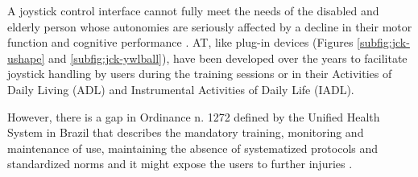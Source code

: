 A joystick control interface cannot fully meet the needs of the disabled and elderly person whose autonomies are seriously affected by a decline in their motor function and cognitive performance \cite{rechy2012}. AT, like plug-in devices (Figures \ref{subfig:jck-ushape} and \ref{subfig:jck-ywlball}), have been developed over the years to facilitate joystick handling by users during the training sessions or in their Activities of Daily Living (ADL) and Instrumental Activities of Daily Life  (IADL)\cite{american2014, american2008}. 

However, there is a gap in Ordinance n. 1272 defined by the Unified Health System in Brazil that describes the mandatory training, monitoring and maintenance of use, maintaining the absence of systematized protocols and standardized norms and it might expose the users to further injuries \cite{valentini2019,portaria2013, anexos2013}. 

